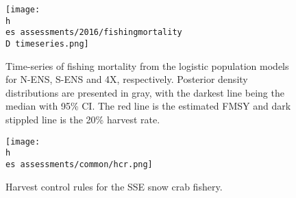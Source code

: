 \documentclass[11pt]{article}
\newcommand{\D}{.}
\newcommand{\h}{\string~/}
\newcommand{\es}{bio.data/bio.snowcrab/}
\begin{document}
\begin{figure}
\centering
\texttt{[image: \\h \\es assessments/2016/fishingmortality\\D timeseries.png]}\\
\caption{Time-series of fishing mortality from the logistic population models for N-ENS, S-ENS and 4X, respectively. Posterior density distributions are presented in gray, with the darkest line being the median with 95\% CI. The red line is the estimated FMSY and dark stippled line is the 20\% harvest rate.}
\end{figure}
\clearpage
%
%

\begin{figure}
\centering
\texttt{[image: \\h \\es assessments/common/hcr.png]}\\ 
\caption{Harvest control rules for the SSE snow crab fishery.}
\end{figure}
\clearpage
\end{document}
